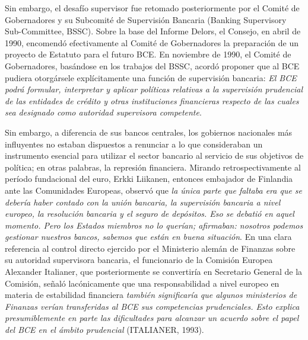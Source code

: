 \documentclass[10pt,a4paper]{article}
\begin{document}
{{} Sin embargo, el desafío supervisor fue retomado posteriormente por el Comité de Gobernadores y su Subcomité de Supervisión Bancaria (Banking Supervisory Sub-Committee, BSSC). Sobre la base del Informe Delors, el Consejo, en abril de 1990, encomendó efectivamente al Comité de Gobernadores la preparación de un proyecto de Estatuto para el futuro BCE. En noviembre de 1990, el Comité de Gobernadores, basándose en los trabajos del BSSC, acordó proponer que al BCE pudiera otorgársele explícitamente una función de supervisión bancaria: \textit{El BCE podrá formular, interpretar y aplicar políticas relativas a la supervisión prudencial de las entidades de crédito y otras instituciones financieras respecto de las cuales sea designado como autoridad supervisora competente}.

Sin embargo, a diferencia de sus bancos centrales, los gobiernos nacionales más influyentes no estaban dispuestos a renunciar a lo que consideraban un instrumento esencial para utilizar el sector bancario al servicio de sus objetivos de política; en otras palabras, la represión financiera. Mirando retrospectivamente al período fundacional del euro, Erkki Liikanen, entonces embajador de Finlandia ante las Comunidades Europeas, observó que \textit{la única parte que faltaba era que se debería haber contado con la unión bancaria, la supervisión bancaria a nivel europeo, la resolución bancaria y el seguro de depósitos. Eso se debatió en aquel momento. Pero los Estados miembros no lo querían; afirmaban: nosotros podemos gestionar nuestros bancos, sabemos que están en buena situación}. En una clara referencia al control directo ejercido por el Ministerio alemán de Finanzas sobre su autoridad supervisora bancaria, el funcionario de la Comisión Europea Alexander Italianer, que posteriormente se convertiría en Secretario General de la Comisión, señaló lacónicamente que una responsabilidad a nivel europeo en materia de estabilidad financiera \textit{también significaría que algunos ministerios de Finanzas verían transferidas al BCE sus competencias prudenciales. Esto explica presumiblemente en parte las dificultades para alcanzar un acuerdo sobre el papel del BCE en el ámbito prudencial} (ITALIANER, 1993).

}
\end{document}
